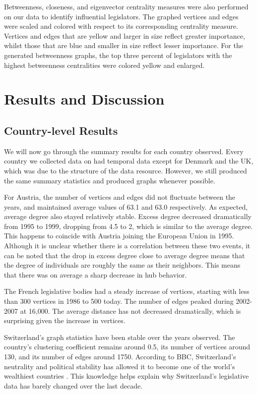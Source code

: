 \documentclass[12pt]{article}
\begin{document}
\begin{multicols*}{2}
Betweenness, closeness, and eigenvector centrality measures were also performed on our data to identify influential legislators. The graphed vertices and edges were scaled and colored with respect to its corresponding centrality measure. Vertices and edges that are yellow and larger in size reflect greater importance, whilst those that are blue and smaller in size reflect lesser importance. For the generated betweenness graphs, the top three percent of legislators with the highest betweenness centralities were colored yellow and enlarged.

\section{Results and Discussion}
\subsection{Country-level Results}
We will now go through the summary results for each country observed. Every country we collected data on had temporal data except for Denmark and the UK, which was due to the structure of the data resource. However, we still produced the same summary statistics and produced graphs whenever possible.

For Austria, the number of vertices and edges did not fluctuate between the years, and maintained average values of 63.1 and 63.0 respectively. As expected, average degree also stayed relatively stable. Excess degree decreased dramatically from 1995 to 1999, dropping from 4.5 to 2, which is similar to the average degree. This happens to coincide with Austria joining the European Union in 1995. Although it is unclear whether there is a correlation between these two events, it can be noted that the drop in excess degree close to average degree means that the degree of individuals are roughly the same as their neighbors. This means that there was on average a sharp decrease in hub behavior.

The French legislative bodies had a steady increase of vertices, starting with less than 300 vertices in 1986 to 500 today. The number of edges peaked during 2002-2007 at 16,000. The average distance has not decreased dramatically, which is surprising given the increase in vertices.

Switzerland's graph statistics have been stable over the years observed. The country's clustering coefficient remains around 0.5, its number of vertices around 130, and its number of edges around 1750. According to BBC, Switzerland's neutrality and political stability has allowed it to become one of the world's wealthiest countries \cite{switzerland}. This knowledge helps explain why Switzerland's legislative data has barely changed over the last decade.


\end{multicols*}
\end{document}
